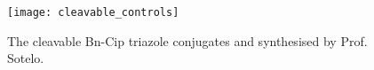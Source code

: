 \begin{figure}[H]
	\begin{center}
		\texttt{[image: cleavable\_controls]}
		\caption{
			The cleavable Bn-Cip triazole conjugates  and  synthesised by Prof. Sotelo.
			\label{fig:cleavable_controls}}
	\end{center}
\end{figure}




